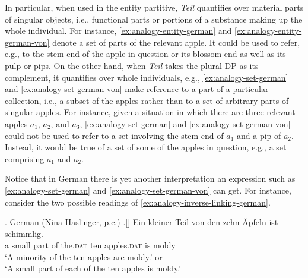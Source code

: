 In particular, when used in the entity partitive, \textit{Teil} quantifies over material parts of singular objects, i.e., functional parts or portions of a substance making up the whole individual. For instance, \ref{ex:analogy-entity-german} and \ref{ex:analogy-entity-german-von} denote a set of parts of the relevant apple. It could be used to refer, e.g., to the stem end of the apple in question or its blossom end as well as its pulp or pips. On the other hand, when \textit{Teil} takes the plural DP as its complement, it quantifies over whole individuals, e.g., \ref{ex:analogy-set-german} and \ref{ex:analogy-set-german-von} make reference to a part of a particular collection, i.e., a subset of the apples rather than to a set of arbitrary parts of singular apples. For instance, given a situation in which there are three relevant apples $a_1$, $a_2$, and $a_3$, \ref{ex:analogy-set-german} and \ref{ex:analogy-set-german-von} could not be used to refer to a set involving the stem end of $a_1$ and a pip of $a_2$. Instead, it would be true of a set of some of the apples in question, e.g., a set comprising $a_1$ and $a_2$.

Notice that in German there is yet another interpretation an expression such as \ref{ex:analogy-set-german} and \ref{ex:analogy-set-german-von} can get. For instance, consider the two possible readings of \ref{ex:analogy-inverse-linking-german}. 

\ex. German (Nina Haslinger, p.c.)\label{ex:analogy-inverse-linking-german}
\bg.[] Ein kleiner Teil von den zehn Äpfeln ist schimmlig.\\
 a small part of the\textsc{.dat} ten apples\textsc{.dat} is moldy\\
 `A minority of the ten apples are moldy.' or\\
 `A small part of each of the ten apples is moldy.'

